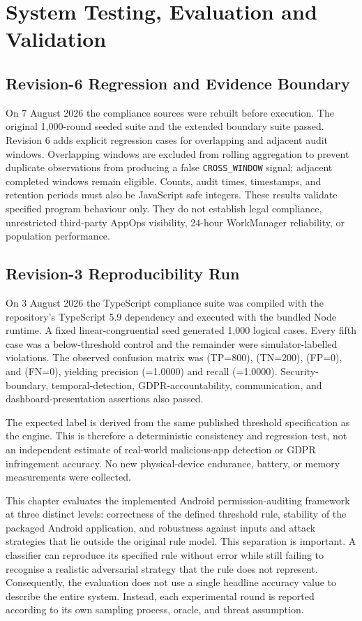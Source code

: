 \newpage
\section{System Testing, Evaluation and Validation}

\subsection{Revision-6 Regression and Evidence Boundary}

On 7 August 2026 the compliance sources were rebuilt before execution. The original 1,000-round seeded suite and the extended boundary suite passed. Revision 6 adds explicit regression cases for overlapping and adjacent audit windows. Overlapping windows are excluded from rolling aggregation to prevent duplicate observations from producing a false \texttt{CROSS\_WINDOW} signal; adjacent completed windows remain eligible. Counts, audit times, timestamps, and retention periods must also be JavaScript safe integers. These results validate specified program behaviour only. They do not establish legal compliance, unrestricted third-party AppOps visibility, 24-hour WorkManager reliability, or population performance.

\subsection{Revision-3 Reproducibility Run}

On 3 August 2026 the TypeScript compliance suite was compiled with the repository's TypeScript 5.9 dependency and executed with the bundled Node runtime. A fixed linear-congruential seed generated 1,000 logical cases. Every fifth case was a below-threshold control and the remainder were simulator-labelled violations. The observed confusion matrix was (TP=800), (TN=200), (FP=0), and (FN=0), yielding precision (=1.0000) and recall (=1.0000). Security-boundary, temporal-detection, GDPR-accountability, communication, and dashboard-presentation assertions also passed.

The expected label is derived from the same published threshold specification as the engine. This is therefore a deterministic consistency and regression test, not an independent estimate of real-world malicious-app detection or GDPR infringement accuracy. No new physical-device endurance, battery, or memory measurements were collected.

This chapter evaluates the implemented Android permission-auditing framework at three distinct levels: correctness of the defined threshold rule, stability of the packaged Android application, and robustness against inputs and attack strategies that lie outside the original rule model. This separation is important. A classifier can reproduce its specified rule without error while still failing to recognise a realistic adversarial strategy that the rule does not represent. Consequently, the evaluation does not use a single headline accuracy value to describe the entire system. Instead, each experimental round is reported according to its own sampling process, oracle, and threat assumption.

